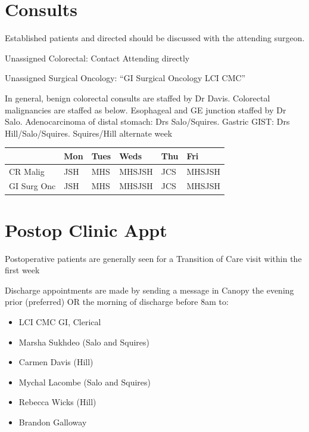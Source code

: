 \documentclass[
]{book}
\providecommand{\tightlist}{%
  \setlength{\itemsep}{0pt}\setlength{\parskip}{0pt}}
\begin{document}
\hypertarget{consults}{%
\section{Consults}\label{consults}}

Established patients and directed should be discussed with the attending surgeon.

Unassigned Colorectal: Contact Attending directly

Unassigned Surgical Oncology: ``GI Surgical Oncology LCI CMC''

In general, benign colorectal consults are staffed by Dr Davis. Colorectal malignancies are staffed as below. Esophageal and GE junction staffed by Dr Salo. Adenocarcinoma of distal stomach: Drs Salo/Squires. Gastric GIST: Drs Hill/Salo/Squires. Squires/Hill alternate week

\begin{longtable}[]{@{}llllll@{}}
\toprule\noalign{}
& Mon & Tues & Weds & Thu & Fri \\
\midrule\noalign{}
\endhead
\bottomrule\noalign{}
\endlastfoot
CR Malig & JSH & MHS & MHSJSH & JCS & MHSJSH \\
GI Surg Onc & JSH & MHS & MHSJSH & JCS & MHSJSH \\
\end{longtable}

\hypertarget{postop-clinic-appt}{%
\section{Postop Clinic Appt}\label{postop-clinic-appt}}

Postoperative patients are generally seen for a Transition of Care visit within the first week

Discharge appointments are made by sending a message in Canopy the evening prior (preferred) OR the morning of discharge before 8am to:

\begin{itemize}
\tightlist
\item
  LCI CMC GI, Clerical
\item
  Marsha Sukhdeo (Salo and Squires)
\item
  Carmen Davis (Hill)
\item
  Mychal Lacombe (Salo and Squires)
\item
  Rebecca Wicks (Hill)
\item
  Brandon Galloway
\end{itemize}
\end{document}
